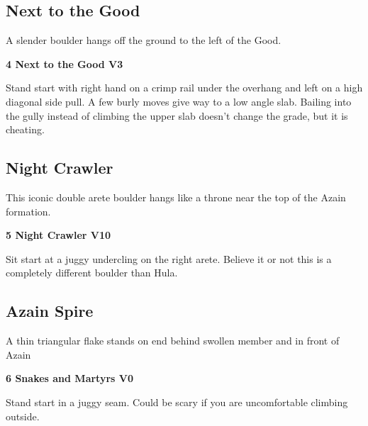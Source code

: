 \begin{multicols}{2}
			\subsection*{Next to the Good}\label{bf:Next to the Good}
			A slender boulder hangs off the ground to the left of the Good.\\
			
					\label{rt:Next to the Good}
\colorbox{green!20}{
\parbox{0.95\linewidth}{
\textbf{
4 Next to the Good V3  \warn
}
}
}

					\begin{adjustwidth}{0.5cm}{}				
					Stand start with right hand on a crimp rail under the overhang and left on a high diagonal side pull. A few burly moves give way to a low angle slab. Bailing into the gully instead of climbing the upper slab doesn't change the grade, but it is cheating.
					\end{adjustwidth}
			\subsection*{Night Crawler}\label{bf:Night Crawler}
			This iconic double arete boulder hangs like a throne near the top of the Azain formation.\\
			

					\label{rt:Night Crawler}
\colorbox{red!20}{
\parbox{0.95\linewidth}{
\textbf{
5 Night Crawler V10  
}
}
}

					\begin{adjustwidth}{0.5cm}{}				
					Sit start at a juggy undercling on the right arete. Believe it or not this is a completely different boulder than Hula.
					\end{adjustwidth}
			\subsection*{Azain Spire}\label{bf:Azain Spire}
			A thin triangular flake stands on end behind swollen member and in front of Azain\\
			

					\label{rt:Snakes and Martyrs}
\colorbox{green!20}{
\parbox{0.95\linewidth}{
\textbf{
6 Snakes and Martyrs V0  
}
}
}

					\begin{adjustwidth}{0.5cm}{}				
					 Stand start in a juggy seam. Could be scary if you are uncomfortable climbing outside.
					\end{adjustwidth}

\end{multicols}
